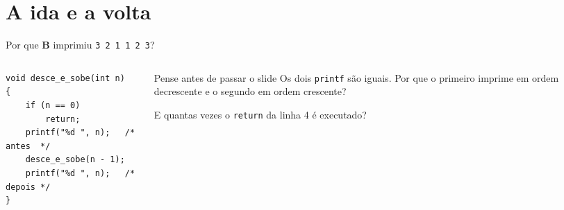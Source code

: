 \documentclass[aspectratio=169]{beamer}
\begin{document}
\section{A ida e a volta}

\begin{frame}[fragile]{Por que \textbf{B} imprimiu \texttt{3 2 1 1 2 3}?}
  \begin{columns}[c]
    \begin{column}{0.5\textwidth}
\begin{lstlisting}[style=tinyC]
void desce_e_sobe(int n)
{
    if (n == 0)
        return;
    printf("%d ", n);   /* antes  */
    desce_e_sobe(n - 1);
    printf("%d ", n);   /* depois */
}
\end{lstlisting}
    \end{column}
    \begin{column}{0.46\textwidth}
      \begin{block}{Pense antes de passar o slide}
        \small Os dois \texttt{printf} são iguais. Por que o primeiro
        imprime em ordem decrescente e o segundo em ordem crescente?

        \medskip
        E quantas vezes o \texttt{return} da linha 4 é executado?
      \end{block}
    \end{column}
  \end{columns}
\end{frame}
\end{document}
